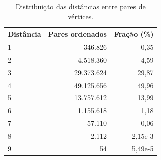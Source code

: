 \begin{table}[ht]
\centering
\caption{Distribuição das distâncias entre pares de vértices.}
\label{tab:distancias}
\small
\begin{tabular}{lrr}
\hline
Distância & Pares ordenados & Fração (\%) \\
\hline
1 & 346.826 & 0,35 \\
2 & 4.518.360 & 4,59 \\
3 & 29.373.624 & 29,87 \\
4 & 49.125.656 & 49,96 \\
5 & 13.757.612 & 13,99 \\
6 & 1.155.618 & 1,18 \\
7 & 57.110 & 0,06 \\
8 & 2.112 & 2,15e-3 \\
9 & 54 & 5,49e-5 \\
\hline
\end{tabular}
\end{table}
